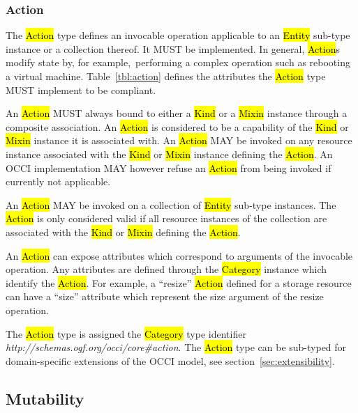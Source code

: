 \documentclass[10pt,a4paper]{article}
\begin{document}
\subsubsection{Action}
The \hl{Action} type defines an invocable operation applicable to an \hl{Entity}
sub-type instance or a collection thereof. It MUST be implemented. In general,
\hl{Action}s modify state by, for example,~performing a complex operation such as
rebooting a virtual machine.
%
Table~\ref{tbl:action} defines the attributes the \hl{Action} type MUST
implement to be compliant.


An \hl{Action} MUST always bound to either a \hl{Kind} or a \hl{Mixin} instance
through a composite association. An \hl{Action} is considered to be a
capability of the \hl{Kind} or \hl{Mixin} instance it is associated with.  An
\hl{Action} MAY be invoked on any resource instance associated with the
\hl{Kind} or \hl{Mixin} instance defining the \hl{Action}. An OCCI
implementation MAY however refuse an \hl{Action} from being invoked if
currently not applicable.

An \hl{Action} MAY be invoked on a collection of \hl{Entity} sub-type
instances. The \hl{Action} is only considered valid if all resource instances
of the collection are associated with the \hl{Kind} or \hl{Mixin} defining the
\hl{Action}.

An \hl{Action} can expose attributes which correspond to arguments of the
invocable operation.  Any attributes are defined through the \hl{Category}
instance which identify the \hl{Action}. For example, a ``resize'' \hl{Action}
defined for a storage resource can have a ``size'' attribute which represent the
size argument of the resize operation.

The \hl{Action} type is assigned the \hl{Category} type identifier
\textit{http://schemas.ogf.org/occi/core\#action}.
%
The \hl{Action} type can be sub-typed for domain-specific extensions of the
OCCI model, see section~\ref{sec:extensibility}.

\subsection{Mutability}
\end{document}
